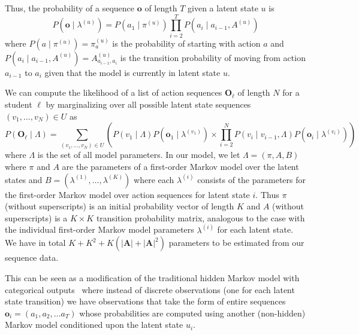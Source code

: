 Thus, the probability of a sequence $\mathbf{o}$ of length $T$ given a
latent state $u$ is
\begin{equation}
  P(\mathbf{o} \mid \lambda^{(u)}) = P(a_1 \mid \pi^{(u)}) \prod_{i=2}^T P(a_i \mid
  a_{i-1}, A^{(u)})
\end{equation}
where $P(a \mid \pi^{(u)}) = \pi^{(u)}_a$ is the probability of starting
with action $a$ and $P(a_i \mid a_{i-1}, A^{(u)}) = A^{(u)}_{a_{i-1}, a_i}$
is the transition probability of moving from action $a_{i-1}$ to $a_{i}$
given that the model is currently in latent state $u$.

We can compute the likelihood of a list of action sequences
$\mathbf{O}_\ell$ of length $N$ for a student $\ell$ by marginalizing over
all possible latent state sequences $(v_1, \ldots, v_N) \in U$ as
\begin{equation}
  P(\mathbf{O}_\ell \mid \Lambda)
  = \sum_{(v_1, \ldots, v_N) \in U} \left(P(v_1 \mid \Lambda)
  P(\mathbf{o}_1 \mid \lambda^{(v_1)}) \times \prod_{i=2}^N P(v_i \mid
  v_{i-1}, \Lambda) P(\mathbf{o}_i \mid \lambda^{(v_i)})\right)
\end{equation}
where $\Lambda$ is the set of all model parameters.  In our model, we let
$\Lambda = (\pi, A, B)$ where $\pi$ and
$A$ are the parameters of a first-order Markov model over the latent states
and $B = (\lambda^{(1)}, \ldots, \lambda^{(K)})$ where each $\lambda^{(i)}$
consists of the parameters for the first-order Markov model over action
sequences for latent state $i$. Thus $\pi$ (without superscripts) is an
initial probability vector of length $K$ and $A$ (without superscripts) is
a $K \times K$ transition probability matrix, analogous to the case with
the individual first-order Markov model parameters $\lambda^{(i)}$ for each
latent state. We have in total $K + K^2 + K(|\mathbf{A}| + |\mathbf{A}|^2)$
parameters to be estimated from our sequence data.

This can be seen as a modification of the traditional hidden Markov
model with categorical outputs~\cite{Rabiner:1990:RSR} where instead of
discrete observations (one for each latent state transition) we have
observations that take the form of entire sequences $\mathbf{o}_i = (a_1,
a_2, \ldots a_T)$ whose probabilities are computed using another
(non-hidden) Markov model conditioned upon the latent state $u_i$.

